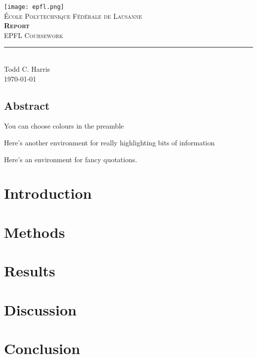 \documentclass[11pt,titlepage]{report}
\begin{document}
\begin{titlepage}
	\centering
    \texttt{[image: epfl.png]}\\[0.25cm] 	%
    \textsc{\LARGE École Polytechnique Fédérale de Lausanne}\\ \vspace{\fill}
    \textbf{\textsc{\fontsize{50}{50}\selectfont Report}}\\ \vspace{\fill}		
	\textsc{\LARGE EPFL Coursework}\\[0.4cm]
	\rule{\linewidth}{0.2 mm} \\[0.5 cm]
	Todd C. Harris \\[2cm] \today
\end{titlepage}
\restoregeometry

\thispagestyle{numberonly}
\begin{summary}
\section*{Abstract}

You can choose colours in the preamble

\lipsum[1]
\end{summary}

\begin{invsummary}
Here's another environment for really highlighting bits of information

\lipsum[2]
\end{invsummary}

\begin{fquote}Here's an environment for fancy quotations. \lipsum[3]
\end{fquote}


\chapter{Introduction}


\chapter{Methods}


\chapter{Results}


\chapter{Discussion}


\chapter{Conclusion}


\clearpage
\pagestyle{numberonly}
\printbibliography
\end{document}

